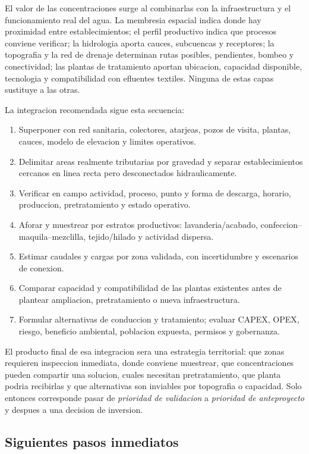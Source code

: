 \documentclass[11pt,letterpaper]{article}
\begin{document}
El valor de las concentraciones surge al combinarlas con la infraestructura y el funcionamiento real del agua. La membresia espacial indica donde hay proximidad entre establecimientos; el perfil productivo indica que procesos conviene verificar; la hidrologia aporta cauces, subcuencas y receptores; la topografia y la red de drenaje determinan rutas posibles, pendientes, bombeo y conectividad; las plantas de tratamiento aportan ubicacion, capacidad disponible, tecnologia y compatibilidad con efluentes textiles. Ninguna de estas capas sustituye a las otras.

La integracion recomendada sigue esta secuencia:
\begin{enumerate}
    \item Superponer  con red sanitaria, colectores, atarjeas, pozos de visita, plantas, cauces, modelo de elevacion y limites operativos.
    \item Delimitar areas realmente tributarias por gravedad y separar establecimientos cercanos en linea recta pero desconectados hidraulicamente.
    \item Verificar en campo actividad, proceso, punto y forma de descarga, horario, produccion, pretratamiento y estado operativo.
    \item Aforar y muestrear por estratos productivos: lavanderia/acabado, confeccion--maquila--mezclilla, tejido/hilado y actividad dispersa.
    \item Estimar caudales y cargas por zona validada, con incertidumbre y escenarios de conexion.
    \item Comparar capacidad y compatibilidad de las plantas existentes antes de plantear ampliacion, pretratamiento o nueva infraestructura.
    \item Formular alternativas de conduccion y tratamiento; evaluar CAPEX, OPEX, riesgo, beneficio ambiental, poblacion expuesta, permisos y gobernanza.
\end{enumerate}

El producto final de esa integracion sera una estrategia territorial: que zonas requieren inspeccion inmediata, donde conviene muestrear, que concentraciones pueden compartir una solucion, cuales necesitan pretratamiento, que planta podria recibirlas y que alternativas son inviables por topografia o capacidad. Solo entonces corresponde pasar de \emph{prioridad de validacion} a \emph{prioridad de anteproyecto} y despues a una decision de inversion.

\subsection{Siguientes pasos inmediatos}
\end{document}
